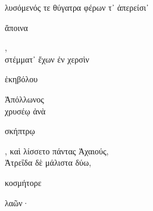 \documentclass{ransom}
\begin{document}
\begin{foreignpage}
\begin{graytext}
λυσόμενός τε θύγατρα φέρων τ᾽ ἀπερείσι᾽ \begin{whitetext}ἄποινα\end{whitetext},\\
στέμματ᾽ ἔχων ἐν χερσὶν \begin{whitetext}ἑκηβόλου\end{whitetext} Ἀπόλλωνος\\
χρυσέῳ ἀνὰ \begin{whitetext}σκήπτρῳ\end{whitetext}, καὶ λίσσετο πάντας Ἀχαιούς,\hfill{}\\
Ἀτρεΐδα δὲ μάλιστα δύω, \begin{whitetext}κοσμήτορε\end{whitetext} λαῶν·\\

\end{graytext}


\end{foreignpage}
\end{document}
